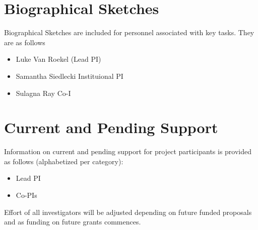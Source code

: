 \documentclass[11pt]{article}
\begin{document}
%
\newpage

\pagestyle{empty}

\pagestyle{plain}
\newpage

%

\renewcommand*\contentsname{Table of Contents}
\tableofcontents

\vfill
\newpage
{}

\newpage



\appendix


\newpage

\section{Biographical Sketches}
\label{sec:cvs}

Biographical Sketches are included for personnel associated with key tasks.  They are as follows

\begin{itemize}
\item Luke Van Roekel (Lead PI)
\item Samantha Siedlecki {Instituional PI}
\item Sulagna Ray {Co-I}
\end{itemize}

\newpage
\nopagecolor

\newpage

\newpage

\newpage


\newpage

\section{Current and Pending Support}
\label{sec:support}

\bigskip
\noindent

\bigskip
Information on current and pending support for project participants is provided
as follows (alphabetized per category):
\begin{itemize}
\item Lead PI
\item Co-PIs
\end{itemize}

\bigskip
Effort of all investigators will be adjusted depending on future funded
proposals and as funding on future grants commences.

\newpage

\newpage

\newpage

\newpage


\newpage


\newpage


\newpage


\newpage
\end{document}
